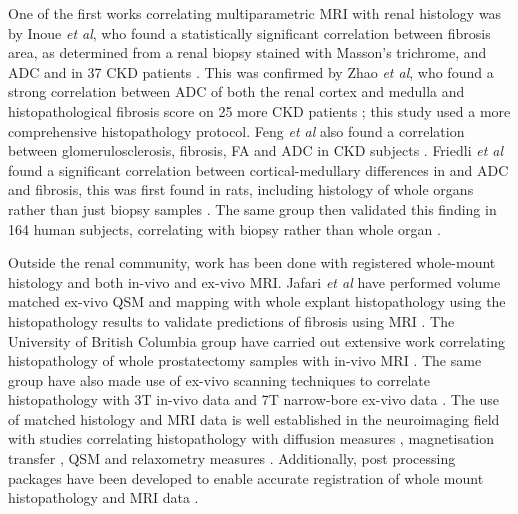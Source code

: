One of the first works correlating multiparametric \ac{MRI} with renal histology was by Inoue \textit{et al}, who found a statistically significant correlation between fibrosis area, as determined from a renal biopsy stained with Masson's trichrome, and \ac{ADC} and \ttwostar in 37 \ac{CKD} patients \cite{inoue_noninvasive_2011}. This was confirmed by Zhao \textit{et al}, who found a strong correlation between \ac{ADC} of both the renal cortex and medulla and histopathological fibrosis score on 25 more \ac{CKD} patients \cite{zhao_assessment_2014}; this study used a more comprehensive histopathology protocol. Feng \textit{et al} also found a correlation between glomerulosclerosis, fibrosis, \ac{FA} and \ac{ADC} in \ac{CKD} subjects \cite{feng_dti_2015}. Friedli \textit{et al} found a significant correlation between cortical-medullary differences in \tone and \ac{ADC} and fibrosis, this was first found in rats, including histology of whole organs rather than just biopsy samples \cite{friedli_new_2016}. The same group then validated this finding in 164 human subjects, correlating with biopsy rather than whole organ \cite{berchtold_validation_2020}.

Outside the renal community, work has been done with registered whole-mount histology and both in-vivo and ex-vivo \ac{MRI}. Jafari \textit{et al} have performed volume matched ex-vivo \ac{QSM} and \ttwostar mapping with whole explant histopathology using the histopathology results to validate predictions of fibrosis using \ac{MRI} \cite{jafari_integrated_2021}. The University of British Columbia group have carried out extensive work correlating histopathology of whole prostatectomy samples with in-vivo \ac{MRI} \cite{sabouri_mr_2017, dhatt_mri_2020}. The same group have also made use of ex-vivo scanning techniques to correlate histopathology with 3T in-vivo data and 7T narrow-bore ex-vivo data \cite{uribe_vivo_2015}. The use of matched histology and \ac{MRI} data is well established in the neuroimaging field \cite{lazari_can_2021} with studies correlating histopathology with diffusion measures \cite{peters_white_2019, moll_multiple_2011, howard_joint_2019, mollink_white_2019}, magnetisation transfer \cite{mottershead_high_2003, seewann_diffusely_2009}, \ac{QSM} \cite{hametner_influence_2018, stuber_myelin_2014} and relaxometry measures \cite{bagnato_untangling_2018, reeves_combined_2016}. Additionally, post processing packages have been developed to enable accurate registration of whole mount histopathology and \ac{MRI} data \cite{huszar_tensor_2019, huszar_automated_2019}.

